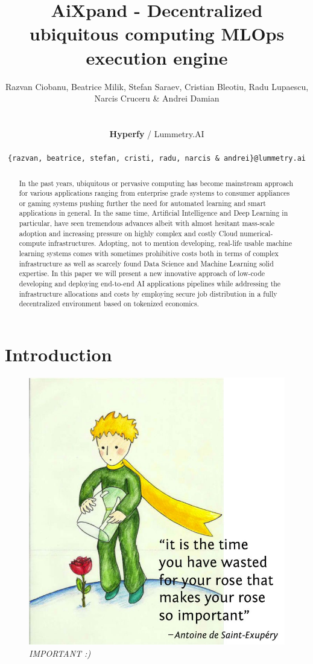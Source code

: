 \documentclass{article}
\title{
AiXpand - Decentralized ubiquitous computing MLOps execution engine
}
\author{
  Razvan Ciobanu, Beatrice Milik, Stefan Saraev, Cristian Bleotiu, \And Radu Lupaescu, Narcis Cruceru \& Andrei Damian \\\\\\
  \textbf{Hyperfy} / Lummetry.AI \\\\
  \texttt{\{razvan, beatrice, stefan, cristi, radu, narcis \& andrei\}@lummetry.ai} \\
}
\begin{document}
\maketitle


\begin{abstract}
In the past years, ubiquitous or pervasive computing has become mainstream approach for various applications ranging from enterprise grade systems to consumer appliances or gaming systems pushing further the need for automated learning and smart applications in general. In the same time, Artificial Intelligence and Deep Learning in particular, have seen tremendous advances albeit with almost hesitant mass-scale adoption and increasing pressure on highly complex and costly Cloud numerical-compute infrastructures. Adopting, not to mention developing, real-life usable machine learning systems comes with sometimes prohibitive costs both in terms of complex infrastructure as well as scarcely found Data Science and Machine Learning solid expertise. In this paper we will present a new innovative approach of low-code developing and deploying end-to-end AI applications pipelines while addressing the infrastructure allocations and costs by employing secure job distribution in a fully decentralized environment based on tokenized economics. 
\end{abstract}



\section{Introduction}

\begin{figure}[htp]
    \centering
    \includegraphics[width=16cm]{rose.jpg}
    \caption{\textit{IMPORTANT :)}}
    \label{fig:rose}
\end{figure}
\end{document}
